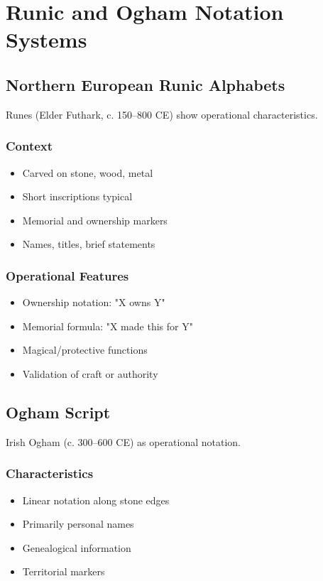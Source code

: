 \section{Runic and Ogham Notation Systems}

\subsection{Northern European Runic Alphabets}

Runes (Elder Futhark, c. 150--800 CE) show operational characteristics.

\subsubsection{Context}
\begin{itemize}
    \item Carved on stone, wood, metal
    \item Short inscriptions typical
    \item Memorial and ownership markers
    \item Names, titles, brief statements
\end{itemize}

\subsubsection{Operational Features}
\begin{itemize}
    \item Ownership notation: "X owns Y"
    \item Memorial formula: "X made this for Y"
    \item Magical/protective functions
    \item Validation of craft or authority
\end{itemize}

\subsection{Ogham Script}

Irish Ogham (c. 300--600 CE) as operational notation.

\subsubsection{Characteristics}
\begin{itemize}
    \item Linear notation along stone edges
    \item Primarily personal names
    \item Genealogical information
    \item Territorial markers
\end{itemize}

